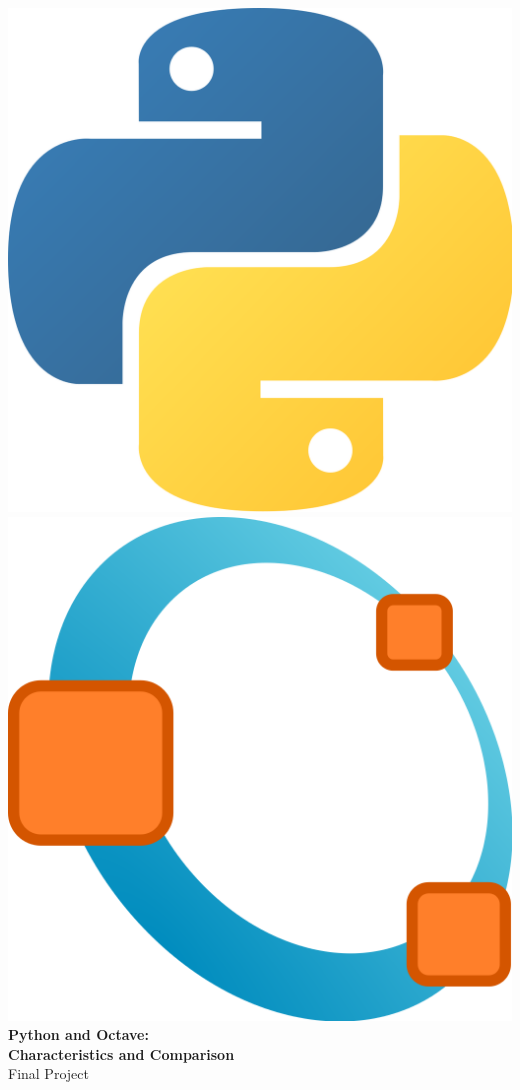\documentclass{article}
\begin{document}
\begin{center}
\includegraphics[scale=0.05]{Python-Logo.png}\qquad
\includegraphics[scale=0.06]{GNU-Octave-Logo.png}\\
\bigskip
\textbf{\large Python and Octave:\\Characteristics and Comparison}\\
\medskip Final Project


\end{center}
\end{document}
